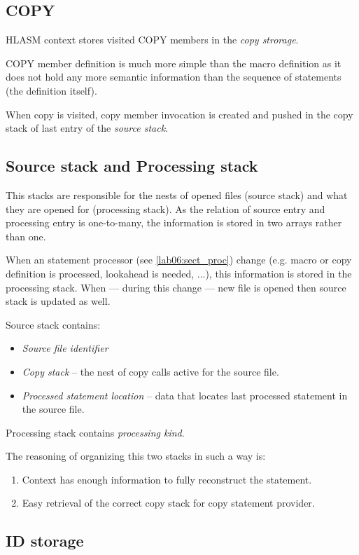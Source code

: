 \subsection{COPY}

HLASM context stores visited COPY members in the \emph{copy strorage}.

COPY member definition is much more simple than the macro definition as it does not hold any more semantic information than the sequence of statements (the definition itself).

When copy is visited, copy member invocation is created and pushed in the copy stack of last entry of the \emph{source stack}.

\subsection{Source stack and Processing stack}

This stacks are responsible for the nests of opened files (source stack) and what they are opened for (processing stack). As the relation of source entry and processing entry is one-to-many, the information is stored in two arrays rather than one.

When an statement processor (see \cref{lab06:sect_proc}) change (e.g. macro or copy definition is processed, lookahead is needed, ...), this information is stored in the processing stack. When --- during this change --- new file is opened then source stack is updated as well.

Source stack contains:
\begin{itemize}
	\item \emph{Source file identifier}
	\item \emph{Copy stack} -- the nest of copy calls active for the source file.
	\item \emph{Processed statement location} -- data that locates last processed statement in the source file.
\end{itemize}
Processing stack contains \emph{processing kind}.

The reasoning of organizing this two stacks in such a way is:
\begin{enumerate}
	\item Context has enough information to fully reconstruct the statement.
	\item Easy retrieval of the correct copy stack for copy statement provider.
\end{enumerate} 

\subsection{ID storage}


